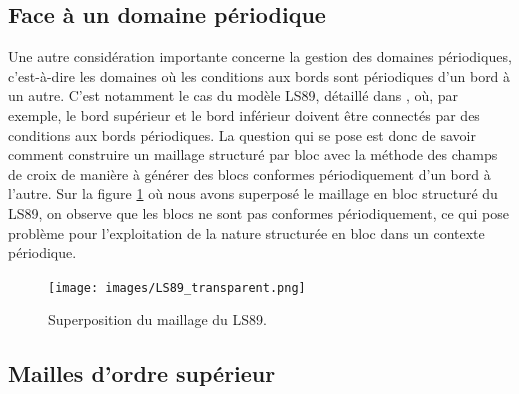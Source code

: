 \subsection*{Face à un domaine périodique}

Une autre considération importante concerne la gestion des domaines périodiques, c'est-à-dire les domaines où les conditions aux bords sont périodiques d'un bord à un autre. C'est notamment le cas du modèle LS89, détaillé dans \cite{gourdain2010advanced}, où, par exemple, le bord supérieur et le bord inférieur doivent être connectés par des conditions aux bords périodiques. La question qui se pose est donc de savoir comment construire un maillage structuré par bloc avec la méthode des champs de croix de manière à générer des blocs conformes périodiquement d'un bord à l'autre. Sur la figure \ref{LS89_transparent} où nous avons superposé le maillage en bloc structuré du LS89, on observe que les blocs ne sont pas conformes périodiquement, ce qui pose problème pour l'exploitation de la nature structurée en bloc dans un contexte périodique.

\begin{figure}[!h]
\centering
\texttt{[image: images/LS89\_transparent.png]}
\caption{Superposition du maillage du LS89.}
\label{LS89_transparent}
\end{figure}


\subsection*{Mailles d'ordre supérieur}

